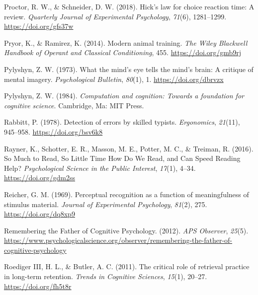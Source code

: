 \documentclass[
  oneside,
  12pt]{crumpbook}
\newlength{\cslhangindent}
\newlength{\cslentryspacingunit} %
\newenvironment{CSLReferences}[2] %
 {%
  \setlength{\parindent}{0pt}
  \ifodd #1
  \let\oldpar\par
  \def\par{\hangindent=\cslhangindent\oldpar}
  \fi
  \setlength{\parskip}{#2\cslentryspacingunit}
 }%
 {}
\begin{document}
\begin{CSLReferences}{1}{0}
\leavevmode{}%
Proctor, R. W., \& Schneider, D. W. (2018). Hick's law for choice reaction time: {A} review. \emph{Quarterly Journal of Experimental Psychology}, \emph{71}(6), 1281--1299. \url{https://doi.org/gfs37w}

\leavevmode{}%
Pryor, K., \& Ramirez, K. (2014). Modern animal training. \emph{The Wiley Blackwell Handbook of Operant and Classical Conditioning}, 455. \url{https://doi.org/gmb9rj}

\leavevmode{}%
Pylyshyn, Z. W. (1973). What the mind's eye tells the mind's brain: {A} critique of mental imagery. \emph{Psychological Bulletin}, \emph{80}(1), 1. \url{https://doi.org/dbrvzx}

\leavevmode{}%
Pylyshyn, Z. W. (1984). \emph{Computation and cognition: {Towards} a foundation for cognitive science}. {Cambridge, Ma: MIT Press}.

\leavevmode{}%
Rabbitt, P. (1978). Detection of errors by skilled typists. \emph{Ergonomics}, \emph{21}(11), 945--958. \url{https://doi.org/bsv6k8}

\leavevmode{}%
Rayner, K., Schotter, E. R., Masson, M. E., Potter, M. C., \& Treiman, R. (2016). So {Much} to {Read}, {So Little Time How Do We Read}, and {Can Speed Reading Help}? \emph{Psychological Science in the Public Interest}, \emph{17}(1), 4--34. \url{https://doi.org/gdm2ss}

\leavevmode{}%
Reicher, G. M. (1969). Perceptual recognition as a function of meaningfulness of stimulus material. \emph{Journal of Experimental Psychology}, \emph{81}(2), 275. \url{https://doi.org/dq8xp9}

\leavevmode{}%
Remembering the {Father} of {Cognitive Psychology}. (2012). \emph{APS Observer}, \emph{25}(5). \url{https://www.psychologicalscience.org/observer/remembering-the-father-of-cognitive-psychology}

\leavevmode{}%
Roediger III, H. L., \& Butler, A. C. (2011). The critical role of retrieval practice in long-term retention. \emph{Trends in Cognitive Sciences}, \emph{15}(1), 20--27. \url{https://doi.org/fh5t8r}


\end{CSLReferences}
\end{document}
